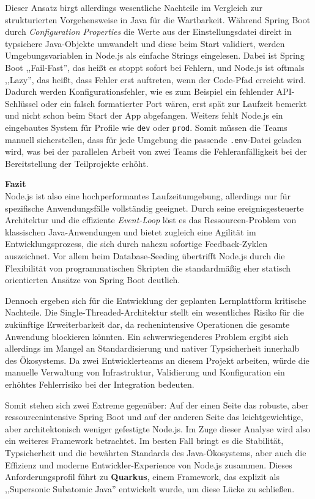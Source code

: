 Dieser Ansatz birgt allerdings wesentliche Nachteile im Vergleich zur strukturierten Vorgehensweise in Java für die Wartbarkeit. Während Spring Boot durch \textit{Configuration Properties} die Werte aus der Einstellungsdatei direkt in typsichere Java-Objekte umwandelt und diese beim Start validiert, werden Umgebungsvariablen in Node.js als einfache Strings eingelesen. Dabei ist Spring Boot ,,Fail-Fast'', das heißt es stoppt sofort bei Fehlern, und Node.js ist oftmals ,,Lazy'', das heißt, dass Fehler erst auftreten, wenn der Code-Pfad erreicht wird. Dadurch werden Konfigurationsfehler, wie es zum Beispiel ein fehlender API-Schlüssel oder ein falsch formatierter Port wären, erst spät zur Laufzeit bemerkt und nicht schon beim Start der App abgefangen. Weiters fehlt Node.js ein eingebautes System für Profile wie \texttt{dev} oder \texttt{prod}. Somit müssen die Teams manuell sicherstellen, dass für jede Umgebung die passende \texttt{.env}-Datei geladen wird, was bei der parallelen Arbeit von zwei Teams die Fehleranfälligkeit bei der Bereitstellung der Teilprojekte erhöht.

\vspace{0.7cm}
\textbf{Fazit} \\
Node.js ist also eine hochperformantes Laufzeitumgebung, allerdings nur für spezifische Anwendungsfälle vollständig geeignet. Durch seine ereignisgesteuerte Architektur und die effiziente \textit{Event-Loop} löst es das Ressourcen-Problem von klassischen Java-Anwendungen und bietet zugleich eine Agilität im Entwicklungsprozess, die sich durch nahezu sofortige Feedback-Zyklen auszeichnet. Vor allem beim Database-Seeding übertrifft Node.js durch die Flexibilität von programmatischen Skripten die standardmäßig eher statisch orientierten Ansätze von Spring Boot deutlich.

Dennoch ergeben sich für die Entwicklung der geplanten Lernplattform kritische Nachteile. Die Single-Threaded-Architektur stellt ein wesentliches Risiko für die zukünftige Erweiterbarkeit dar, da rechenintensive Operationen die gesamte Anwendung blockieren könnten. Ein schwerwiegenderes Problem ergibt sich allerdings im Mangel an Standardisierung und nativer Typsicherheit innerhalb des Ökosystems. Da zwei Entwicklerteams an diesem Projekt arbeiten, würde die manuelle Verwaltung von Infrastruktur, Validierung und Konfiguration ein erhöhtes Fehlerrisiko bei der Integration bedeuten.

Somit stehen sich zwei Extreme gegenüber: Auf der einen Seite das robuste, aber ressourcenintensive Spring Boot und auf der anderen Seite das leichtgewichtige, aber architektonisch weniger gefestigte Node.js. Im Zuge dieser Analyse wird also ein weiteres Framework betrachtet. Im besten Fall bringt es die Stabilität, Typsicherheit und die bewährten Standards des Java-Ökosystems, aber auch die Effizienz und moderne Entwickler-Experience von Node.js zusammen. Dieses Anforderungsprofil führt zu \textbf{Quarkus}, einem Framework, das explizit als ,,Supersonic Subatomic Java'' entwickelt wurde, um diese Lücke zu schließen.



